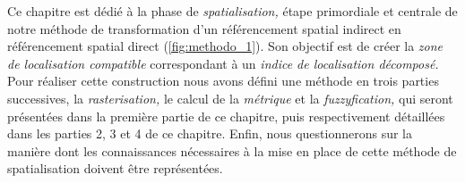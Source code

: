 Ce chapitre est dédié à la phase de \emph{spatialisation,} étape primordiale et centrale de notre méthode de transformation d'un référencement spatial indirect en référencement spatial direct (\autoref{fig:methodo_1}).
%
Son objectif est de créer la \emph{zone de localisation compatible} correspondant à un \emph{indice de localisation décomposé.} Pour réaliser cette construction nous avons défini une méthode en trois parties successives, la \emph{rasterisation,} le calcul de la \emph{métrique} et la \emph{fuzzyfication,} qui seront présentées dans la première partie de ce chapitre, puis respectivement détaillées dans les parties 2, 3 et 4 de ce chapitre. Enfin, nous questionnerons sur la manière dont les connaissances nécessaires à la mise en place de cette méthode de spatialisation doivent être représentées.

